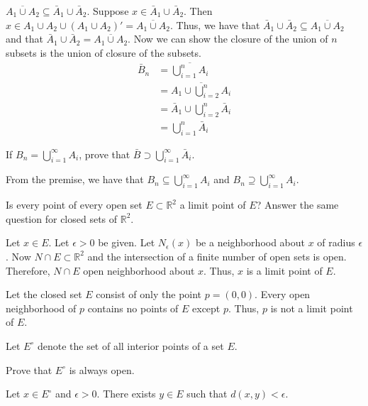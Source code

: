 \begin{exercise}
\begin{exercise}[label = (\alph*), ref = \arabic{exercisei} (\alph*)]
    \(\overline{A_1\cup A_2}\subseteq\bar{A}_1\cup \bar{A}_2\).
    Suppose \(x\in\bar{A}_1\cup \bar{A}_2\).
    Then \(x\in A_1\cup A_2\cup (A_1\cup A_2)' = \overline{A_1\cup A_2}\).
    Thus, we have that
    \(\bar{A}_1\cup \bar{A}_2\subseteq\overline{A_1\cup A_2}\) and that
    \(\bar{A}_1\cup \bar{A}_2 = \overline{A_1\cup A_2}\).
    Now we can show the closure of the union of \(n\) subsets is the union of
    closure of the subsets.
    \begin{align*}
      \bar{B}_n & = \overline{\bigcup_{i = 1}^nA_i}\\
                & = \overline{A_1\cup\bigcup_{i = 2}^nA_i}\\
                & = \bar{A}_1\cup\bigcup_{i = 2}^n\bar{A}_i\\
                & = \bigcup_{i = 1}^n\bar{A}_i
    \end{align*}
  \item
    If \(B_n = \bigcup_{i = 1}^{\infty}A_i\), prove that
    \(\bar{B}\supset\bigcup_{i = 1}^{\infty}\bar{A}_i\).
    \par\smallskip
    From the premise, we have that \(B_n\subseteq\bigcup_{i = 1}^{\infty}A_i\)
    and \(B_n\supseteq\bigcup_{i = 1}^{\infty}A_i\).
  \end{exercise}
\item
  Is every point of every open set \(E\subset\mathbb{R}^2\) a limit point of
  \(E\)?
  Answer the same question for closed sets of \(\mathbb{R}^2\).
  \par\smallskip
  Let \(x\in E\).
  Let \(\epsilon > 0\) be given.
  Let \(N_{\epsilon}(x)\) be a neighborhood about \(x\) of radius \(\epsilon\).
  Now \(N\cap E\subset\mathbb{R}^2\) and the intersection of a finite number of
  open sets is open.
  Therefore, \(N\cap E\) open neighborhood about \(x\).
  Thus, \(x\) is a limit point of \(E\).
  \par\smallskip
  Let the closed set \(E\) consist of only the point \(p = (0, 0)\).
  Every open neighborhood of \(p\) contains no points of \(E\) except \(p\).
  Thus, \(p\) is not a limit point of \(E\).
\item
  Let \(E^{\circ}\) denote the set of all interior points of a set \(E\).
  \begin{exercise}[label = (\alph*), ref = \arabic{exercisei}(\alph*)]
  \item
    Prove that \(E^{\circ}\) is always open.
    \par\smallskip
    Let \(x\in E^{\circ}\) and \(\epsilon > 0\).
    There exists \(y\in E\) such that \(d(x,y) < \epsilon\).

\end{exercise}
\end{exercise}
